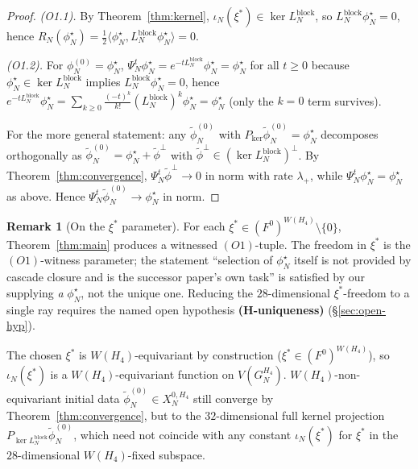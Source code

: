 \documentclass[11pt]{article}
\theoremstyle{definition}
\newtheorem{remark}[theorem]{Remark}
\begin{document}
\begin{proof}
\emph{(O1.1).} By Theorem~\ref{thm:kernel}, $\iota_N(\xi^{*}) \in
\ker L_N^{\mathrm{block}}$, so
$L_N^{\mathrm{block}} \phi^{\star}_{N} = 0$, hence
$R_N(\phi^{\star}_{N}) =
\tfrac12 \langle \phi^{\star}_{N}, L_N^{\mathrm{block}}
\phi^{\star}_{N} \rangle = 0$.

\emph{(O1.2).} For $\phi_N^{(0)} = \phi^{\star}_{N}$,
$\Psi_N^{t} \phi^{\star}_{N} = e^{-t L_N^{\mathrm{block}}}
\phi^{\star}_{N} = \phi^{\star}_{N}$ for all $t \geq 0$ because
$\phi^{\star}_{N} \in \ker L_N^{\mathrm{block}}$ implies
$L_N^{\mathrm{block}} \phi^{\star}_{N} = 0$, hence
$e^{-t L_N^{\mathrm{block}}} \phi^{\star}_{N} =
\sum_{k \geq 0} \frac{(-t)^{k}}{k!}
(L_N^{\mathrm{block}})^{k} \phi^{\star}_{N} = \phi^{\star}_{N}$
(only the $k = 0$ term survives).

For the more general statement: any $\widetilde\phi_N^{(0)}$ with
$P_{\ker} \widetilde\phi_N^{(0)} = \phi^{\star}_{N}$ decomposes
orthogonally as
$\widetilde\phi_N^{(0)} = \phi^{\star}_{N} + \widetilde\phi^{\perp}$
with $\widetilde\phi^{\perp} \in (\ker L_N^{\mathrm{block}})^{\perp}$.
By Theorem~\ref{thm:convergence},
$\Psi_N^{t} \widetilde\phi^{\perp} \to 0$ in norm with rate
$\lambda_{+}$, while $\Psi_N^{t} \phi^{\star}_{N} =
\phi^{\star}_{N}$ as above. Hence
$\Psi_N^{t} \widetilde\phi_N^{(0)} \to \phi^{\star}_{N}$ in norm.
\end{proof}

\begin{remark}[On the $\xi^{*}$ parameter]
\label{rmk:xi-freedom}
For each $\xi^{*} \in (F^0)^{W(H_4)} \setminus \{0\}$,
Theorem~\ref{thm:main} produces a witnessed $(O1)$-tuple. The
freedom in $\xi^{*}$ is the $(O1)$-witness parameter; the
\cite[\S 3.4 lines 637--639]{CascadeMechanism} statement
``selection of $\phi^{\star}_{N}$ itself is not provided by
cascade closure and is the successor paper's own task'' is
satisfied by our supplying \emph{a} $\phi^{\star}_{N}$, not the
unique one. Reducing the $28$-dimensional $\xi^{*}$-freedom to a
single ray requires the named open hypothesis
\textbf{(H-uniqueness)} (\S\ref{sec:open-hyp}).

The chosen $\xi^{*}$ is $W(H_4)$-equivariant by construction
($\xi^{*} \in (F^0)^{W(H_4)}$), so $\iota_N(\xi^{*})$ is a
$W(H_4)$-equivariant function on $V(G_N^{H_4})$.
$W(H_4)$-non-equivariant initial data
$\widetilde\phi_N^{(0)} \in X_N^{0, H_4}$ still converge by
Theorem~\ref{thm:convergence}, but to the $32$-dimensional full kernel
projection $P_{\ker L_N^{\mathrm{block}}} \widetilde\phi_N^{(0)}$,
which need not coincide with any constant
$\iota_N(\xi^{*})$ for $\xi^{*}$ in the $28$-dimensional
$W(H_4)$-fixed subspace.
\end{remark}
\end{document}
